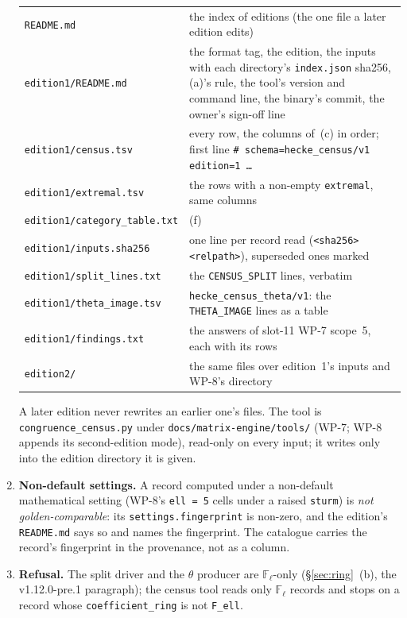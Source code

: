 \documentclass[11pt]{article}
\theoremstyle{remark}
\newcommand{\F}{\mathbb{F}}
\newcommand{\Fl}{\F_\ell}
\begin{document}
\begin{enumerate}[label=(\alph*)]
\begin{center}
\begin{tabular}{@{}>{\raggedright\arraybackslash}p{4.3cm}>{\raggedright\arraybackslash}p{9.6cm}@{}}
  \texttt{README.md} & the index of editions (the one file a later edition edits) \\
  \texttt{edition1/README.md} & the format tag, the edition, the inputs with each directory's \texttt{index.json} sha256, (a)'s rule, the tool's version and command line, the binary's commit, the owner's sign-off line \\
  \texttt{edition1/census.tsv} & every row, the columns of~(c) in order; first line \texttt{\# schema=hecke\_census/v1 edition=1 \dots} \\
  \texttt{edition1/extremal.tsv} & the rows with a non-empty \texttt{extremal}, same columns \\
  \texttt{edition1/category\_table.txt} & (f) \\
  \texttt{edition1/inputs.sha256} & one line per record read (\texttt{<sha256>  <relpath>}), superseded ones marked \\
  \texttt{edition1/split\_lines.txt} & the \texttt{CENSUS\_SPLIT} lines, verbatim \\
  \texttt{edition1/theta\_image.tsv} & \texttt{hecke\_census\_theta/v1}: the \texttt{THETA\_IMAGE} lines as a table \\
  \texttt{edition1/findings.txt} & the answers of slot-11 WP-7 scope~5, each with its rows \\
  \texttt{edition2/} & the same files over edition~1's inputs and WP-8's directory \\
  \end{tabular}
  \end{center}
  A later edition never rewrites an earlier one's files. The tool is \texttt{congruence\_census.py}
  under \texttt{docs/matrix-engine/tools/} (WP-7; WP-8 appends its second-edition mode), read-only
  on every input; it writes only into the edition directory it is given.
\item \textbf{Non-default settings.} A record computed under a non-default mathematical setting
  (WP-8's \texttt{ell = 5} cells under a raised \texttt{sturm}) is \emph{not golden-comparable}:
  its \texttt{settings.fingerprint} is non-zero, and the edition's \texttt{README.md} says so and
  names the fingerprint. The catalogue carries the record's fingerprint in the provenance, not as
  a column.
\item \textbf{Refusal.} The split driver and the $\theta$ producer are $\Fl$-only
  (\S\ref{sec:ring}~(b), the v1.12.0-pre.1 paragraph); the census tool reads only
  $\Fl$ records and stops on a record whose \texttt{coefficient\_ring} is not \texttt{F\_ell}.
\end{enumerate}
\end{document}
